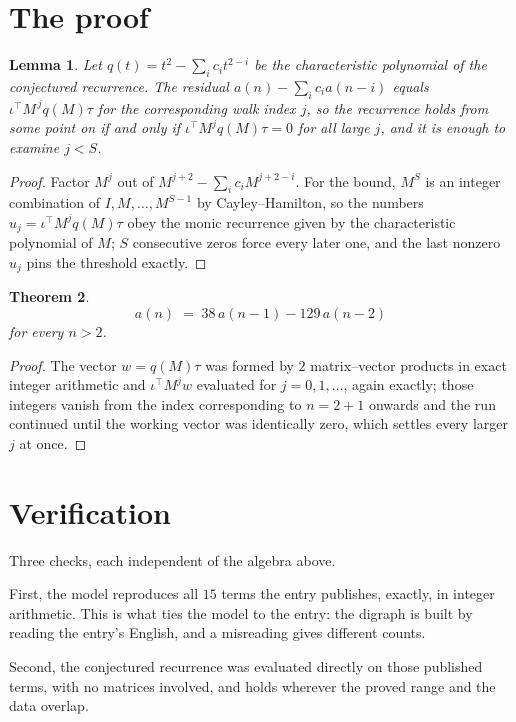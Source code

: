 \documentclass[11pt,a4paper]{article}
\theoremstyle{plain}
\newtheorem{theorem}{Theorem}
\newtheorem{lemma}[theorem]{Lemma}
\theoremstyle{definition}
\begin{document}
\section{The proof}

\begin{lemma}\label{lem:crit}
Let $q(t)=t^{2}-\sum_i c_it^{2-i}$ be the characteristic polynomial of the
conjectured recurrence. The residual $a(n)-\sum_ic_ia(n-i)$ equals
$\iota^{\!\top}M^{\,j}q(M)\tau$ for the corresponding walk index $j$, so the recurrence
holds from some point on if and only if $\iota^{\!\top}M^{j}q(M)\tau=0$ for all large $j$,
and it is enough to examine $j<S$.
\end{lemma}

\begin{proof}
Factor $M^{j}$ out of $M^{j+2}-\sum_ic_iM^{j+2-i}$. For the bound, $M^{S}$
is an integer combination of $I,M,\dots,M^{S-1}$ by Cayley--Hamilton, so the numbers
$u_j=\iota^{\!\top}M^{j}q(M)\tau$ obey the monic recurrence given by the characteristic
polynomial of $M$; $S$ consecutive zeros force every later one, and the last nonzero $u_j$
pins the threshold exactly.
\end{proof}

\begin{theorem}
\[
a(n)\;=\;38\,a(n-1) - 129\,a(n-2)
\]
for every $n>2$.
\end{theorem}

\begin{proof}
The vector $w=q(M)\tau$ was formed by $2$ matrix--vector products in exact integer
arithmetic and $\iota^{\!\top}M^{j}w$ evaluated for $j=0,1,\dots$, again exactly; those
integers vanish from the index corresponding to $n=2+1$ onwards and the run continued
until the working vector was identically zero, which settles every larger $j$ at once.
\end{proof}

\section{Verification}

Three checks, each independent of the algebra above.

First, the model reproduces all $15$ terms the entry publishes, exactly, in integer
arithmetic. This is what ties the model to the entry: the digraph is built by reading the
entry's English, and a misreading gives different counts.

Second, the conjectured recurrence was evaluated directly on those published terms, with no
matrices involved, and holds wherever the proved range and the data overlap.
\end{document}
